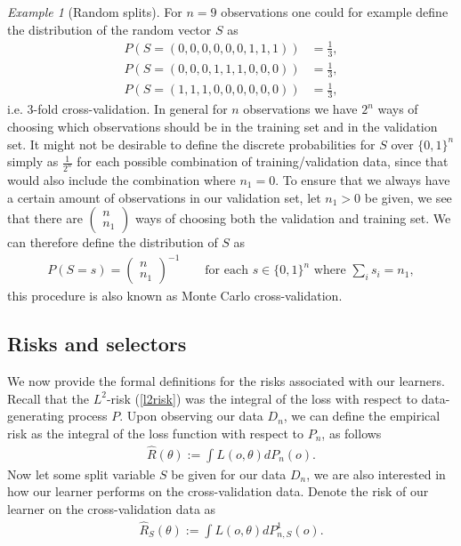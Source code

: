 \documentclass[11pt, a4paper]{article}
\theoremstyle{definition}
\theoremstyle{remark}
\newtheorem{example}{Example}
\newcommand{\btheta}{\theta}
\begin{document}
\begin{example}[Random splits] \label{splits}
    For $ n = 9 $ observations one could for example define the distribution of the random vector $ S $ as 
   \begin{align*}
       P(S = (0, 0, 0, 0, 0, 0, 1, 1, 1)) &= \frac{1}{3}, \\
       P(S = (0, 0, 0, 1, 1, 1, 0, 0, 0)) &= \frac{1}{3}, \\
       P(S = (1, 1, 1, 0, 0, 0, 0, 0, 0)) &= \frac{1}{3},
   \end{align*}
    i.e. 3-fold cross-validation.
    In general for $ n $ observations we have $ 2^{n} $ ways of choosing which observations should be in the training set and in the validation set. It might not be desirable to define the discrete probabilities for $ S $ over $ \{0,1\}^{n} $ simply as $ \frac{1}{2^{n}} $ for each possible combination of training/validation data, since that would also include the combination where $ n_1 = 0 $. To ensure that we always have a certain amount of observations in our validation set, let $ n_1 > 0 $ be given, we see that there are $ \begin{pmatrix}
        n \\ n_1
    \end{pmatrix}$ ways of choosing both the validation and training set. We can therefore define the distribution of $ S $ as 
    \begin{align*}
        P \left(S = s \right) = \begin{pmatrix}
            n \\ n_1
    \end{pmatrix}^{-1} \qquad \text{for each } s \in \{0,1\}^{n} \text{ where } \sum_{i} s_i = n_1,
    \end{align*}
    this procedure is also known as Monte Carlo cross-validation.
\end{example}

\subsection{Risks and selectors}
We now provide the formal definitions for the risks associated with our learners. Recall that the $L^2$-risk (\ref{l2risk}) was the integral of the loss with respect to data-generating process $P$. Upon observing our data $D_n$, we can define the empirical risk as the integral of the loss function with respect to $P_n$, as follows
\begin{align*}
    \hat{R}(\btheta) := \int L(o, \btheta) d P_{n}(o).
\end{align*}
 Now let some split variable $ S $ be given for our data $ D_n $, we are also interested in how our learner performs on the cross-validation data. Denote the risk of our learner on the cross-validation data as 
 \begin{align*}
     \hat{R}_S(\theta) :=  \int L(o, \btheta) d P_{n,S}^{1}(o).
 \end{align*}
 
\end{document}
